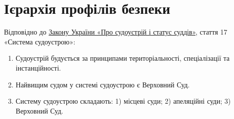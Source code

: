 \documentclass{article}
\begin{document}
\section{Ієрархія профілів безпеки}

Відповідно до \href{https://zakon.rada.gov.ua/laws/show/1402-19}{Закону України «Про судоустрій і статус суддів»}, стаття 17 «Система судоустрою»:
\begin{enumerate}
    \item Судоустрій будується за принципами територіальності, спеціалізації та інстанційності.
    \item Найвищим судом у системі судоустрою є Верховний Суд.
    \item Систему судоустрою складають: 1) місцеві суди; 2) апеляційні суди; 3) Верховний Суд.
\end{enumerate}
\end{document}

